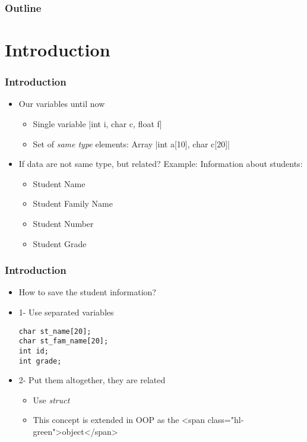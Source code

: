 \documentclass{../c-lecture}
\subtitle{Structures}
\begin{document}
\begin{frame}
  \titlepage{}
\end{frame}
\begin{frame}
  \frametitle{Outline}
  \tableofcontents{}
\end{frame}

\section{Introduction}

\begin{frame}
  \frametitle{Introduction}
  \begin{itemize}
    \item Our variables until now
    \begin{itemize}
      \item Single variable
      |int i, char c, float f|
      \item Set of \textit{\color{YellowOrange} same type} elements: Array
      |int a[10], char c[20]|
    \end{itemize}
  \end{itemize}
\end{frame}

\begin{frame}
  \begin{itemize}
    \item
      If data are not same type, but related? Example: Information about
      students:
    \begin{itemize}
      \item Student Name
      \item Student Family Name
      \item Student Number
      \item Student Grade
    \end{itemize}
  \end{itemize}
\end{frame}

\begin{frame}[fragile]
  \frametitle{Introduction}
  \begin{itemize}
    \item How to save the student information?
    \item 1- Use separated variables
    \begin{verbatim}
char st_name[20];
char st_fam_name[20];
int id;
int grade;
    \end{verbatim}
    \item 2- Put them altogether, they are related
    \begin{itemize}
      \item Use \textit{\color{Cyan} struct}
      \item
        This concept is extended in OOP as the
        <span class="hl-green">object</span>
    \end{itemize}
  \end{itemize}
\end{frame}
\end{document}
